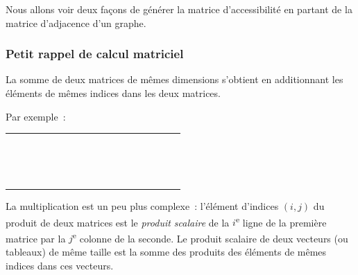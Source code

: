 			Nous allons voir deux façons de générer la matrice d'accessibilité 
			en partant de la matrice d'adjacence d'un graphe.

		\subsubsection{Petit rappel de calcul matriciel}

			La somme de deux matrices de mêmes dimensions s'obtient en 
			additionnant les éléments de mêmes indices dans les deux
			matrices.
			
			Par exemple~:

			\begin{center}
				\tablefirsthead{}
				\tablehead{}
				\tabletail{}
				\tablelasttail{}
				\begin{supertabular}{|m{0.601cm}|m{0.601cm}|m{0.601cm}|m{0.601cm}m{0.601cm}m{0.601cm}|m{0.601cm}|m{0.601cm}|m{0.601cm}|m{0.601cm}m{0.601cm}m{0.601cm}|m{0.601cm}|m{0.601cm}|m{0.61800003cm}|}
				\hhline{---~~~---~~~---}
				 &
				 &
				 &
				~
				 &
				~
				 &
				~
				 &
				 &
				 &
				 &
				~
				 &
				~
				 &
				~
				 &
				 &
				 &
				\centering{}\\\hhline{---~~~---~~~---}
				 &
				 &
				 &
				~
				 &
				\centering{ +} &
				~
				 &
				 &
				 &
				 &
				~
				 &
				\centering{ =} &
				~
				 &
				 &
				 &
				\centering{}\\\hhline{---~~~---~~~---}
				 &
				 &
				 &
				~
				 &
				~
				 &
				~
				 &
				 &
				 &
				 &
				~
				 &
				~
				 &
				~
				 &
				 &
				 &
				\centering{}\\\hhline{---~~~---~~~---}
				\end{supertabular}
			\end{center}

			La multiplication est un peu plus complexe~: 
			l'élément d'indices $(i, j)$ du produit de deux matrices
			est le \textit{produit scalaire} de la $i$\textsuperscript{e} 
			ligne de la première matrice par la $j$\textsuperscript{e} 
			colonne de la seconde. Le produit scalaire de deux vecteurs 
			(ou tableaux) de même taille est la somme des produits des 
			éléments de mêmes indices dans ces vecteurs. 
			
